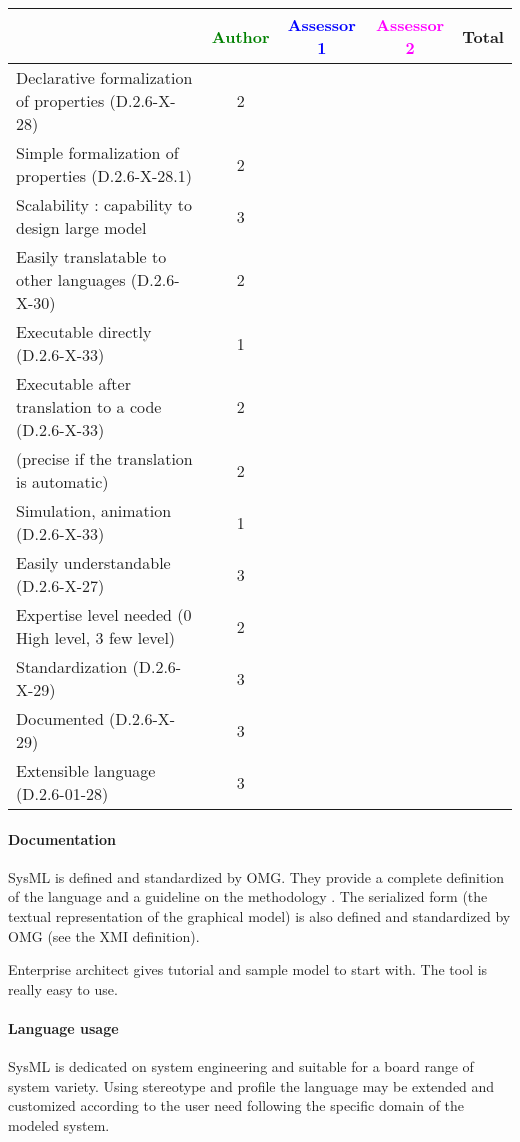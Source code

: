 \begin{tabular}{|l | c | c | c | c|}
\hline
& \textcolor{green}{Author} & \textcolor{blue}{Assessor 1} & \textcolor{magenta}{Assessor 2} & Total \\
\hline
Declarative formalization of properties (D.2.6-X-28) &2 & & & \\
\hline
Simple formalization of properties (D.2.6-X-28.1) &2 & & & \\
\hline
Scalability : capability to design large model &3 & & & \\
\hline
Easily translatable to other languages (D.2.6-X-30) &2 & & & \\
\hline
Executable directly (D.2.6-X-33) &1 & & & \\
\hline
Executable after translation to a code (D.2.6-X-33) & 2 & & & \\
(precise if the translation is automatic) &2 & & & \\
\hline
Simulation, animation (D.2.6-X-33) &1 & & & \\
\hline
Easily understandable (D.2.6-X-27) &3 & & & \\
\hline
Expertise level needed (0 High level, 3 few level) &2 & & & \\
\hline
Standardization (D.2.6-X-29) &3 & & & \\
\hline
Documented (D.2.6-X-29) &3 & & & \\
\hline
Extensible language (D.2.6-01-28) &3 & & & \\
\hline
\end{tabular}


\paragraph{Documentation} 
SysML is  defined and standardized by OMG. They provide a complete
definition of the language and a guideline on the methodology
\cite{SysML}. The serialized form (the textual representation of the
graphical model) is also defined and standardized by OMG (see the XMI
definition).

Enterprise architect gives tutorial and sample model to start
with. The tool is really easy to use.

\paragraph{Language usage} 
SysML is dedicated on system engineering and suitable for a board range of
system variety. Using stereotype and profile the language may be
extended and customized according to the user need following the
specific domain of the modeled system.


